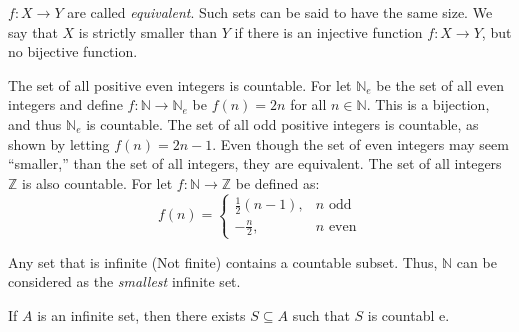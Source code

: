         $f:X\rightarrow{Y}$ are called \textit{equivalent}. Such sets can
        be said to have the same size. We say that $X$ is strictly
        smaller than $Y$ if there is an injective function
        $f:X\rightarrow{Y}$, but no bijective function.
        \begin{example}
            The set of all positive even integers is
            countable. For let $\mathbb{N}_{e}$ be the
            set of all even integers and define
            $f:\mathbb{N}\rightarrow\mathbb{N}_{e}$ be
            $f(n)=2n$ for all $n\in\mathbb{N}$. This is
            a bijection, and thus $\mathbb{N}_{e}$ is
            countable. The set of all odd positive integers
            is countable, as shown by letting
            $f(n)=2n-1$. Even though the set of even
            integers may seem ``smaller,'' than the set of
            all integers, they are equivalent. The set of
            all integers $\mathbb{Z}$ is also countable.
            For let $f:\mathbb{N}\rightarrow\mathbb{Z}$
            be defined as:
            \begin{equation}
                f(n)=
                \begin{cases}
                    \frac{1}{2}(n-1),&n\textrm{ odd}\\
                    -\frac{n}{2},&n\textrm{ even}
                \end{cases}
            \end{equation}
        \end{example}
        Any set that is infinite (Not finite) contains a
        countable subset. Thus, $\mathbb{N}$ can be
        considered as the \textit{smallest} infinite set.
        \begin{theorem}
            If $A$ is an infinite set, then there exists
            $S\subseteq{A}$ such that $S$ is countabl e.
        \end{theorem}
